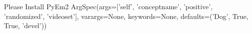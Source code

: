 Please Install PyEm2
ArgSpec(args=['self', 'conceptname', 'positive', 'randomized', 'videoset'], varargs=None, keywords=None, defaults=('Dog', True, True, 'devel'))
